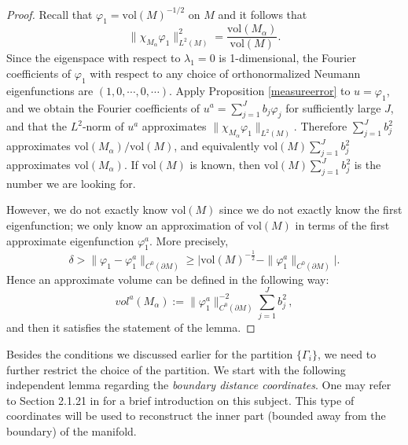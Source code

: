 \documentclass[11pt,letterpaper]{amsart}
\numberwithin{equation}{section}
\theoremstyle{definition}
\theoremstyle{plain}
\theoremstyle{definition}
\theoremstyle{plain}
\theoremstyle{definition}
\theoremstyle{plain}
\newcommand{\vol}{\textrm{vol}}
\begin{document}
\begin{proof}
Recall that $\varphi_1=\vol(M)^{-1/2}$ on $M$ and it follows that
$$\|\chi_{M_{\alpha}}\varphi_1\|^2_{L^2(M)}=\frac{\vol(M_\alpha)}{\vol(M)}.$$
Since the eigenspace with respect to $\lambda_1=0$ is 1-dimensional, the Fourier coefficients of $\varphi_1$ with respect to any choice of orthonormalized Neumann eigenfunctions are $(1,0,\cdots,0,\cdots)$.
Apply Proposition \ref{measureerror} to $u=\varphi_1$, and we obtain the Fourier coefficients of $u^{a}=\sum_{j=1}^{J}b_j\varphi_j$ for sufficiently large $J$, and that the $L^2$-norm of $u^a$ approximates $\|\chi_{M_{\alpha}}\varphi_1\|_{L^2(M)}$. Therefore $\sum_{j=1}^{J}b_j^2$ approximates $\vol(M_\alpha)/\vol(M)$, and equivalently $\vol(M)\sum_{j=1}^{J}b_j^2$ approximates $\vol(M_\alpha)$. If $\vol(M)$ is known, then $\vol(M)\sum_{j=1}^{J}b_j^2$ is the number we are looking for.

However, we do not exactly know $\vol(M)$ since we do not exactly know the first eigenfunction; we only know an approximation of $\vol(M)$ in terms of the first approximate eigenfunction $\varphi_1^a$. More precisely,
$$\delta>\|\varphi_1-\varphi_1^a\|_{C^0(\partial M)} \geqslant \big| \vol(M)^{-\frac{1}{2}}- \|\varphi_1^a\|_{C^0(\partial M)}\big|. $$
Hence an approximate volume can be defined in the following way:
$$vol^{a}(M_{\alpha}):=\|\varphi^a_1\|^{-2}_{C^0(\partial M)}\sum_{j=1}^{J}b_j^2\, ,$$
and then it satisfies the statement of the lemma.
\end{proof}

Besides the conditions we discussed earlier for the partition $\{\Gamma_i\}$, we need to further restrict the choice of the partition. We start with the following independent lemma regarding the \emph{boundary distance coordinates}. One may refer to Section 2.1.21 in \cite{KKL} for a brief introduction on this subject. This type of coordinates will be used to reconstruct the inner part (bounded away from the boundary) of the manifold.
\end{document}
